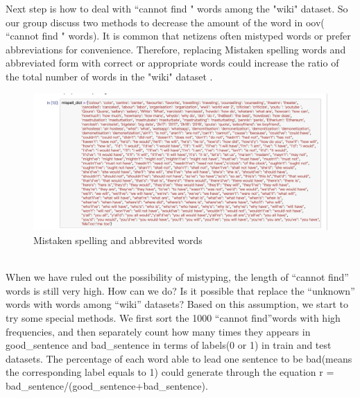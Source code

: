 \documentclass{article}
\begin{document}
\noindent Next step is how to deal with  “cannot find " words among the "wiki" dataset. So our group discuss two  methods to decrease the amount of the word in oov( “cannot find " words).  It is common that netizens often mistyped words or prefer abbreviations for convenience. Therefore, replacing Mistaken spelling words and abbreviated form with correct or appropriate words could increase the ratio of the total number of words in the "wiki" dataset . 
\begin{figure}[h]
	\centering
	\includegraphics[scale = 0.15]{mis.jpeg}
	\caption{Mistaken spelling and abbrevited words}
\end{figure}\\
\noindent When we have ruled out the  possibility of mistyping, the length of “cannot find” words is still very high. How can we do?  Is it possible that replace the “unknown” words with words among “wiki” datasets? Based on this assumption, we start to try some special methods. We first sort the 1000 “cannot find”words with high frequencies, and then separately count how many times they appears in good\_sentence and bad\_sentence in terms of labels(0 or 1) in train and test datasets. The percentage of each word able to lead one sentence to be bad(means the corresponding label equals to 1) could generate through the equation r = bad\_sentence/(good\_sentence+bad\_sentence).\\
\end{document}
